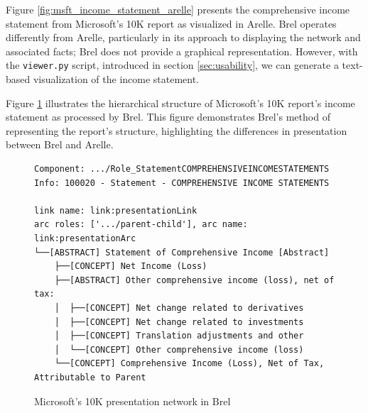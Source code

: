 
Figure \ref{fig:msft_income_statement_arelle} presents the comprehensive income statement from Microsoft's 10K report as visualized in Arelle.  
Brel operates differently from Arelle, particularly in its approach to displaying the network and associated facts; Brel does not provide a graphical representation.  
However, with the \texttt{viewer.py} script, introduced in section \ref{sec:usability},  
we can generate a text-based visualization of the income statement.

Figure \ref{fig:msft_income_statement_network} illustrates the hierarchical structure of Microsoft's 10K report's income statement as processed by Brel.  
This figure demonstrates Brel's method of representing the report's structure, highlighting the differences in presentation between Brel and Arelle.

\begin{figure}[H]
    \begin{lstlisting}[basicstyle=\small\ttfamily]
Component: .../Role_StatementCOMPREHENSIVEINCOMESTATEMENTS
Info: 100020 - Statement - COMPREHENSIVE INCOME STATEMENTS

link name: link:presentationLink
arc roles: ['.../parent-child'], arc name: link:presentationArc
└──[ABSTRACT] Statement of Comprehensive Income [Abstract]
    ├──[CONCEPT] Net Income (Loss)
    ├──[ABSTRACT] Other comprehensive income (loss), net of tax:
    │  ├──[CONCEPT] Net change related to derivatives
    │  ├──[CONCEPT] Net change related to investments
    │  ├──[CONCEPT] Translation adjustments and other
    │  └──[CONCEPT] Other comprehensive income (loss)
    └──[CONCEPT] Comprehensive Income (Loss), Net of Tax, Attributable to Parent
    \end{lstlisting}
    \caption{Microsoft's 10K presentation network in Brel\cite{microsoft_edgar}}
    \label{fig:msft_income_statement_network}
\end{figure}

